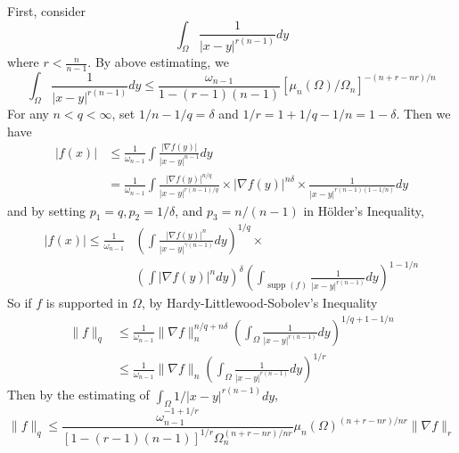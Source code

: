 \begin{enumerate}[label=\Roman*.]
	\noindent First, consider
	\begin{equation*}
		\int_{\Omega} \frac{1}{|x-y|^{r(n-1)}} d y
	\end{equation*}
	where $r < \frac{n}{n-1}$. By above estimating, we 
	\begin{equation*}
		\int_{\Omega} \frac{1}{|x-y|^{r(n-1)}} d y \leq \frac{\omega_{n-1}}{1-(r-1)(n-1)}\left[\mu_n(\Omega) / \Omega_n\right]^{-(n+r-n r) / n}
	\end{equation*}
	For any $n < q < \infty$, set $1/n - 1/q = \delta$ and $1 / r = 1 + 1/q - 1/n = 1-\delta$. Then we have
	\begin{equation*}
		\begin{aligned}
			|f(x)| & \leq \frac{1}{\omega_{n-1}} \int \frac{|\nabla f(y)|}{|x-y|^{n-1}} d y \\
			& = \frac{1}{\omega_{n-1}} \int \frac{|\nabla f(y)|^{n / q}}{|x-y|^{r(n-1) / q}} \times|\nabla f(y)|^{n \delta} \times \frac{1}{|x-y|^{r(n-1)(1-1 / n)}} d y
		\end{aligned}
	\end{equation*}
	and by setting $p_1 = q,p_2 = 1/\delta$, and $p_3 = n / (n-1)$ in H\"older's Inequality,
	\begin{equation*}
		\begin{aligned}
			|f(x)| \leq \frac{1}{\omega_{n-1}} & \left(\int \frac{|\nabla f(y)|^n}{|x-y|^{\gamma(n-1)}} d y\right)^{1 / q} \times \\
			& \left(\int|\nabla f(y)|^n d y\right)^\delta\left(\int_{\operatorname{supp}(f)} \frac{1}{|x-y|^{r(n-1)}} d y\right)^{1-1 / n}
		\end{aligned}
	\end{equation*}
	So if $f$ is supported in $\Omega$, by Hardy-Littlewood-Sobolev's Inequality
	\begin{equation*}
		\begin{aligned}
			\|f\|_q & \leq \frac{1}{\omega_{n-1}}\|\nabla f\|_n^{n / q+n \delta}\left(\int_{\Omega} \frac{1}{|x-y|^{r(n-1)}} d y\right)^{1 / q+1-1 / n} \\
			& \leq \frac{1}{\omega_{n-1}}\|\nabla f\|_n\left(\int_{\Omega} \frac{1}{|x-y|^{r(n-1)}} d y\right)^{1 / r}
		\end{aligned}
	\end{equation*}
	Then by the estimating of $\int_{\Omega} {1}/{|x-y|^{r(n-1)}} d y$,
	\begin{equation*}
		\|f\|_q \leq \frac{\omega_{n-1}^{-1+1 / r}}{[1-(r-1)(n-1)]^{1 / r} \Omega_n^{(n+r-n r) / n r}} \mu_n(\Omega)^{(n+r-n r) / n r}\|\nabla f\|_r

\end{equation*}
\end{enumerate}
